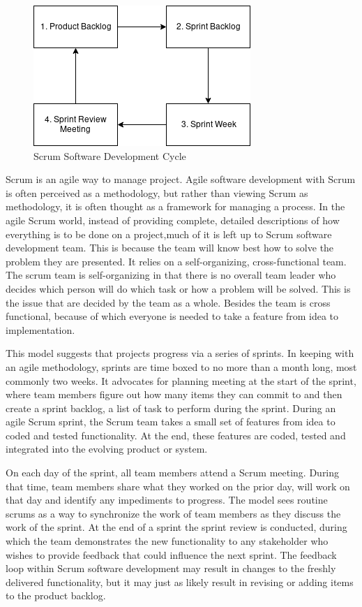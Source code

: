 \begin{figure}[!ht]
\centering
\includegraphics[width = 10 cm]{fig/scrum.png}
\caption{Scrum Software Development Cycle}
\label{fig:scrum}
\end{figure}
Scrum is an agile way to manage project. Agile software development with Scrum is often perceived as a methodology, but rather than viewing Scrum as methodology, it is often thought as a framework for managing a process. In the agile Scrum world, instead of providing complete, detailed descriptions of how everything is to be done on a project,much of it is left up to Scrum software development team. This is because the team will know best how to solve the problem they are presented. It relies on a self-organizing, cross-functional team. The scrum team is self-organizing in that there is no overall team leader who decides which person will do which task or how a problem will be solved. This is the issue that are decided by the team as a whole. Besides the team is cross functional, because of which everyone is needed to take a feature from idea to implementation.

This model suggests that projects progress via a series of sprints. In keeping with an agile methodology, sprints are time boxed to no more than a month long, most commonly two weeks. It advocates for planning meeting at the start of the sprint, where team members figure out how many items they can commit to and then create a sprint backlog, a list of task to perform during the sprint. During an agile Scrum sprint, the Scrum team takes a small set of features from idea to coded and tested functionality. At the end, these features are coded, tested and integrated into the evolving product or system.

On each day of the sprint, all team members attend a Scrum meeting. During that time, team members share what they worked on the prior day, will work on that day and identify any impediments to progress. The model sees routine scrums as a way to synchronize the work of team members as they discuss the work of the sprint. At the end of a sprint the sprint review is conducted, during which the team demonstrates the new functionality to any stakeholder who wishes to provide feedback that could influence the next sprint. The feedback loop within Scrum software development may result in changes to the freshly delivered functionality, but it may just as likely result in revising or adding items to the product backlog.


